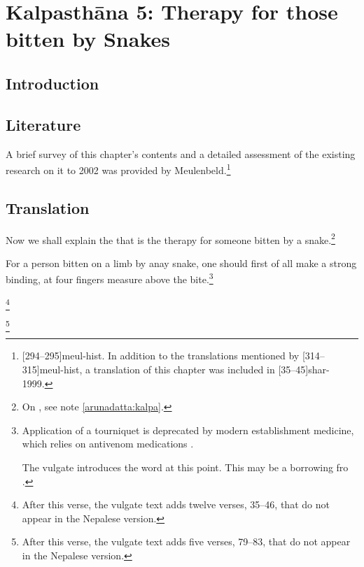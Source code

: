 \chapter{Kalpasthāna 5: Therapy for those bitten by Snakes}

\section{Introduction} 

\section{Literature}

A brief survey of this chapter's contents and a detailed assessment of
the existing research on it to 2002 was provided by
Meulenbeld.\footnote{[294--295]{meul-hist}. In addition to the
    translations mentioned by [314--315]{meul-hist}, a translation
    of this chapter was included in [35--45]{shar-1999}.} 
    
\section{Translation}

\begin{translation}
    \item [1]
    Now we shall explain the  that is the therapy for 
    someone bitten by a snake.\footnote{On , see note 
    \ref{arunadatta:kalpa}.}
    
    \item[3] For a person bitten on a limb by anay snake, one should
first of all make a strong binding, at four fingers measure above the
bite.\footnote{Application of a tourniquet is deprecated by
    modern establishment medicine, which relies on antivenom medications
    \citep[e.g.,][150--151 et passim in the literature]{pill-2013}.
    
    The vulgate introduces the word  at this point.  This may be a 
    borrowing fro .}
    
    \item[4]
    
    
    
    \item[34] \footnote{After this verse, the vulgate text adds twelve
    verses, 35--46, that do not appear in the Nepalese version.}
    
     \item[78] \footnote{After this verse, the vulgate text adds five
        verses, 79--83, that do not appear in the Nepalese version.}
\end{translation}    